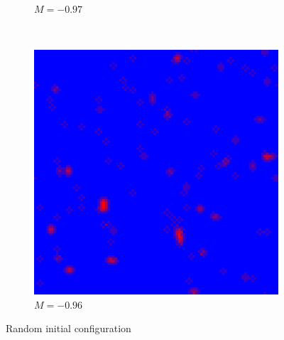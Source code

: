 \documentclass[a4paper,12pt]{article}
\theoremstyle{plain}
\theoremstyle{definition}
\begin{document}
\begin{figure}[H]
\begin{subfigure}[t]{0.3\textwidth}
              \caption*{$M=-0.97$}
          \end{subfigure}
          ~
          \begin{subfigure}[t]{0.3\textwidth}
            \includegraphics[width=\textwidth]{396.png}
             \caption*{$M=-0.96$}
          \end{subfigure}
          \caption*{Random initial configuration}
      \end{figure}
\end{document}
